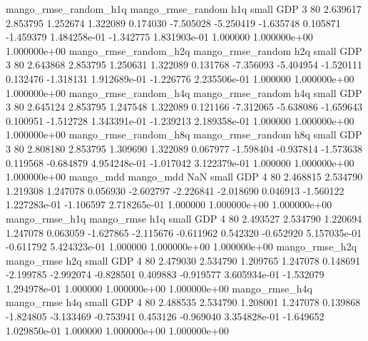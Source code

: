 mango_rmse_random_h1q mango_rmse_random                  h1q      small      GDP                 3 80 2.639617       2.853795 1.252674       1.322089    0.174030     -7.505028     -5.250419    -1.635748       0.105871 -1.459379 1.484258e-01    -1.342775   1.831903e-01            1.000000    1.000000e+00        1.000000e+00
mango_rmse_random_h2q mango_rmse_random                  h2q      small      GDP                 3 80 2.643868       2.853795 1.250631       1.322089    0.131768     -7.356093     -5.404954    -1.520111       0.132476 -1.318131 1.912689e-01    -1.226776   2.235506e-01            1.000000    1.000000e+00        1.000000e+00
mango_rmse_random_h4q mango_rmse_random                  h4q      small      GDP                 3 80 2.645124       2.853795 1.247548       1.322089    0.121166     -7.312065     -5.638086    -1.659643       0.100951 -1.512728 1.343391e-01    -1.239213   2.189358e-01            1.000000    1.000000e+00        1.000000e+00
mango_rmse_random_h8q mango_rmse_random                  h8q      small      GDP                 3 80 2.808180       2.853795 1.309690       1.322089    0.067977     -1.598404     -0.937814    -1.573638       0.119568 -0.684879 4.954248e-01    -1.017042   3.122379e-01            1.000000    1.000000e+00        1.000000e+00
            mango_mdd         mango_mdd                  NaN      small      GDP                 4 80 2.468815       2.534790 1.219308       1.247078    0.056930     -2.602797     -2.226841    -2.018690       0.046913 -1.560122 1.227283e-01    -1.106597   2.718265e-01            1.000000    1.000000e+00        1.000000e+00
       mango_rmse_h1q        mango_rmse                  h1q      small      GDP                 4 80 2.493527       2.534790 1.220694       1.247078    0.063059     -1.627865     -2.115676    -0.611962       0.542320 -0.652920 5.157035e-01    -0.611792   5.424323e-01            1.000000    1.000000e+00        1.000000e+00
       mango_rmse_h2q        mango_rmse                  h2q      small      GDP                 4 80 2.479030       2.534790 1.209765       1.247078    0.148691     -2.199785     -2.992074    -0.828501       0.409883 -0.919577 3.605934e-01    -1.532079   1.294978e-01            1.000000    1.000000e+00        1.000000e+00
       mango_rmse_h4q        mango_rmse                  h4q      small      GDP                 4 80 2.488535       2.534790 1.208001       1.247078    0.139868     -1.824805     -3.133469    -0.753941       0.453126 -0.969040 3.354828e-01    -1.649652   1.029850e-01            1.000000    1.000000e+00        1.000000e+00
